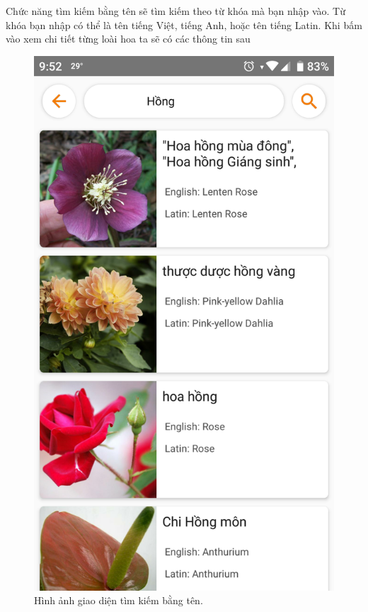 \documentclass[12pt]{report}
\begin{document}
		\newpage
		Chức năng tìm kiếm bằng tên sẽ tìm kiếm theo từ khóa mà bạn nhập vào. Từ khóa bạn nhập có thể là tên tiếng Việt, tiếng Anh, hoặc tên tiếng Latin.
		Khi bấm vào xem chi tiết từng loài hoa ta sẽ có các thông tin sau
		\begin{figure}[h]
			\centering
			\includegraphics[scale=0.2]{app_search_name}
			\caption{Hình ảnh giao diện tìm kiếm bằng tên.}
			\label{fig:app_search_name}
		\end{figure}
		
\end{document}
